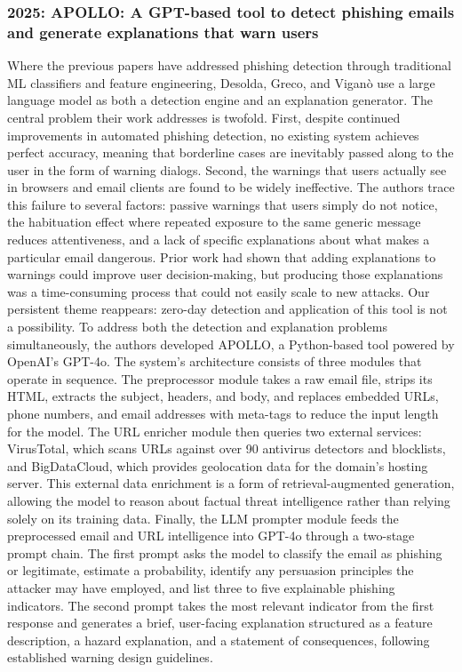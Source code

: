 \documentclass[conference]{IEEEtran}
\begin{document}
\subsubsection{2025: APOLLO: A GPT-based tool to detect phishing emails and generate explanations that warn users}
Where the previous papers have addressed phishing detection through traditional ML classifiers and feature engineering, Desolda, Greco, and Viganò use a large language model as both a detection engine and an explanation generator. The central problem their work addresses is twofold. First, despite continued improvements in automated phishing detection, no existing system achieves perfect accuracy, meaning that borderline cases are inevitably passed along to the user in the form of warning dialogs\cite{desolda_apollo_2025}. Second, the warnings that users actually see in browsers and email clients are found to be widely ineffective. The authors trace this failure to several factors: passive warnings that users simply do not notice, the habituation effect where repeated exposure to the same generic message reduces attentiveness, and a lack of specific explanations about what makes a particular email dangerous\cite{desolda_apollo_2025}. Prior work had shown that adding explanations to warnings could improve user decision-making, but producing those explanations was a time-consuming process that could not easily scale to new attacks\cite{desolda_apollo_2025}. Our persistent theme reappears: zero-day detection and application of this tool is not a possibility.
To address both the detection and explanation problems simultaneously, the authors developed APOLLO, a Python-based tool powered by OpenAI's GPT-4o. The system's architecture consists of three modules that operate in sequence. The preprocessor module takes a raw email file, strips its HTML, extracts the subject, headers, and body, and replaces embedded URLs, phone numbers, and email addresses with meta-tags to reduce the input length for the model\cite{desolda_apollo_2025}. The URL enricher module then queries two external services: VirusTotal, which scans URLs against over 90 antivirus detectors and blocklists, and BigDataCloud, which provides geolocation data for the domain's hosting server\cite{desolda_apollo_2025}. This external data enrichment is a form of retrieval-augmented generation, allowing the model to reason about factual threat intelligence rather than relying solely on its training data. Finally, the LLM prompter module feeds the preprocessed email and URL intelligence into GPT-4o through a two-stage prompt chain. The first prompt asks the model to classify the email as phishing or legitimate, estimate a probability, identify any persuasion principles the attacker may have employed, and list three to five explainable phishing indicators. The second prompt takes the most relevant indicator from the first response and generates a brief, user-facing explanation structured as a feature description, a hazard explanation, and a statement of consequences, following established warning design guidelines\cite{desolda_apollo_2025}.
\end{document}
